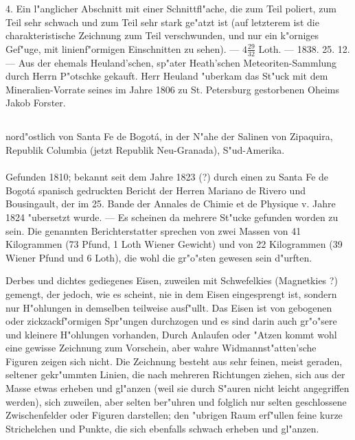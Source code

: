 \documentclass[a4paper, 11pt, oneside, polutonikogreek, german]{article}
\begin{document}
4. Ein l"anglicher Abschnitt mit einer Schnittfl"ache, die zum Teil poliert, zum Teil sehr schwach und zum Teil sehr stark ge"atzt ist (auf letzterem ist die charakteristische Zeichnung zum Teil verschwunden, und nur ein k"orniges Gef"uge, mit linienf"ormigen Einschnitten zu sehen). --- $4\frac{29}{32}$ Loth. --- 1838. 25. 12. --- Aus der ehemals Heuland'schen, sp"ater Heath'schen Meteoriten-Sammlung durch Herrn P"otschke gekauft. Herr Heuland "uberkam das St"uck mit dem Mineralien-Vorrate seines im Jahre 1806 zu St. Petersburg gestorbenen Oheims Jakob Forster.
\subsection[\frakfamily{Rasgatà.}]{}
\begin{center}

nord"ostlich von Santa Fe de Bogotá, in der N"ahe der Salinen von Zipaquira, Republik Columbia (jetzt Republik Neu-Granada), S"ud-Amerika.
\end{center}
\paragraph{}
Gefunden 1810; bekannt seit dem Jahre 1823 (?) durch einen zu Santa Fe de Bogotá spanisch gedruckten Bericht der Herren Mariano de Rivero und Bousingault, der im 25. Bande der Annales de Chimie et de Physique v. Jahre 1824 "ubersetzt wurde. --- Es scheinen da mehrere St"ucke gefunden worden zu sein. Die genannten Berichterstatter sprechen von zwei Massen von 41 Kilogrammen (73 Pfund, 1 Loth Wiener Gewicht) und von 22 Kilogrammen (39 Wiener Pfund und 6 Loth), die wohl die gr"o"sten gewesen sein d"urften.

Derbes und dichtes gediegenes Eisen, zuweilen mit Schwefelkies (Magnetkies ?) gemengt, der jedoch, wie es scheint, nie in dem Eisen eingesprengt ist, sondern nur H"ohlungen in demselben teilweise ausf"ullt. Das Eisen ist von gebogenen oder zickzackf"ormigen Spr"ungen durchzogen und es sind darin auch gr"o"sere und kleinere H"ohlungen vorhanden, Durch Anlaufen oder "Atzen kommt wohl eine gewisse Zeichnung zum Vorschein, aber wahre Widmannst"atten'sche Figuren zeigen sich nicht. Die Zeichnung besteht aus sehr feinen, meist geraden, seltener gekr"ummten Linien, die nach mehreren Richtungen ziehen, sich aus der Masse etwas erheben und gl"anzen (weil sie durch S"auren nicht leicht angegriffen werden), sich zuweilen, aber selten ber"uhren und folglich nur selten geschlossene Zwischenfelder oder Figuren darstellen; den "ubrigen Raum erf"ullen feine kurze Strichelchen und Punkte, die sich ebenfalls schwach erheben und gl"anzen.
\end{document}
